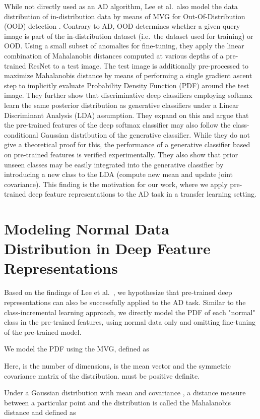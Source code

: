 \documentclass[conference, a4paper]{./template/IEEEtran}
\begin{document}
While not directly used as an AD algorithm, Lee et al.\ also model the data distribution of in-distribution data by means of MVG for Out-Of-Distribution (OOD) detection \cite{Lee2018}.
Contrary to AD, OOD determines whether a given query image is part of the in-distribution dataset (i.e.\ the dataset used for training) or OOD.
Using a small subset of anomalies for fine-tuning, they apply the linear combination of Mahalanobis distances computed at various depths of a pre-trained ResNet \cite{He2016} to a test image.
The test image is additionally pre-processed to maximize Mahalanobis distance by means of performing a single gradient ascent step to implicitly evaluate Probability Density Function (PDF) around the test image. They further show that discriminative deep classifiers employing softmax learn the same posterior distribution as generative classifiers under a Linear Discriminant Analysis (LDA) assumption.
They expand on this and argue that the pre-trained features of the deep softmax classifier may also follow the class-conditional Gaussian distribution of the generative classifier. While they do not give a theoretical proof for this, the performance of a generative classifier based on pre-trained features is verified experimentally.
They also show that prior unseen classes may be easily integrated into the generative classifier by introducing a new class to the LDA (compute new mean and update joint covariance).
This finding is the motivation for our work, where we apply pre-trained deep feature representations to the AD task in a transfer learning setting.

\section{Modeling Normal Data Distribution in Deep Feature Representations}
Based on the findings of Lee et al.\ \cite{Lee2018}, we hypothesize that pre-trained deep representations can also be successfully applied to the AD task.
Similar to the class-incremental learning approach, we directly model the PDF of each "normal" class in the pre-trained features, using normal data only and omitting fine-tuning of the pre-trained model.

We model the PDF using the MVG, defined as

Here,  is the number of dimensions,  is the mean vector and  the symmetric covariance matrix of the distribution.
 must be positive definite.

Under a Gaussian distribution with mean  and covariance , a distance measure between a particular point  and the distribution is called the Mahalanobis distance and defined as
\end{document}
